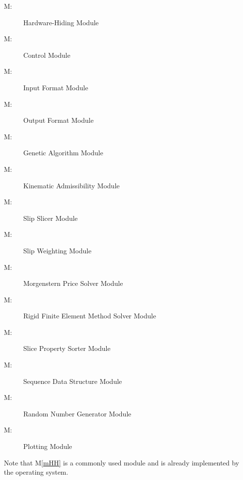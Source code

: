 \documentclass[12pt]{article}
\newcounter{mnum}
\newcommand{\mthemnum}{M\themnum}
\newcommand{\mref}[1]{M\ref{#1}}
\begin{document}
\begin{description}
\item [ \mthemnum \label{mHH}:] Hardware-Hiding
  Module
\item [ \mthemnum \label{mControl}:] Control
  Module
\item [ \mthemnum \label{mInput}:] Input Format
  Module
\item [ \mthemnum \label{mOutput}:] Output Format
  Module
\item [ \mthemnum \label{mGenAlg}:] Genetic
  Algorithm Module
\item [ \mthemnum \label{mKinAdm}:] Kinematic
  Admissibility Module
\item [ \mthemnum \label{mSlipSlicer}:] Slip
  Slicer Module
\item [ \mthemnum \label{mSlipWeight}:] Slip
  Weighting Module
\item [ \mthemnum \label{mMorgPrice}:]
  Morgenstern Price Solver Module
\item [ \mthemnum \label{mRFEM}:] Rigid Finite
  Element Method Solver Module
\item [ \mthemnum \label{mSliceProperty}:] Slice
  Property Sorter Module
\item [ \mthemnum \label{mArrayOps}:] Sequence
  Data Structure Module
\item [ \mthemnum \label{mRandNum}:] Random
  Number Generator Module
\item [ \mthemnum \label{mPlot}:] Plotting
  Module
\end{description}

Note that \mref{mHH} is a commonly used module and is already
implemented by the operating system.
\end{document}
